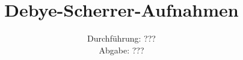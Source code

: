 

\subject{Versuch 41}
\title{Debye-Scherrer-Aufnahmen}
\date{Durchführung: ???\\
      Abgabe: ???}



\maketitle
\newpage







\printbibliography


